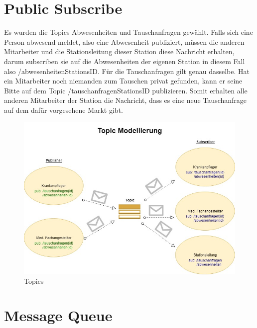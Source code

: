 \documentclass[11pt,
paper=a4,
bibtotocnumbered,	  %
liststotocnumbered,  %
DIV=calc,		  %
tablecaptionabove,	  %
headinclude,
]{article}
\begin{document}
\section{Public Subscribe}
Es wurden die Topics Abwesenheiten und Tauschanfragen gewählt. Falls sich eine Person abwesend meldet, also eine Abwesenheit publiziert, müssen die anderen Mitarbeiter und die Stationsleitung dieser Station diese Nachricht erhalten, darum subscriben sie auf die Abwesenheiten der eigenen Station in diesem Fall also /abwesenheiten{StationsID}. Für die Tauschanfragen gilt genau dasselbe. Hat ein Mitarbeiter noch niemanden zum Tauschen privat gefunden, kann er seine Bitte auf dem Topic /tauschanfragen{StationsID} publizieren. Somit erhalten alle anderen Mitarbeiter der Station die Nachricht, dass es eine neue Tauschanfrage auf dem dafür vorgesehene Markt gibt.
\begin{figure}[H]
\includegraphics[width=1\textwidth]{Bilder/topic.jpg}
\caption{Topics}
\end{figure}
\section{Message Queue}
\end{document}
